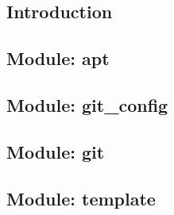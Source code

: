 
\subsection{Introduction}


\subsection{Module: apt}

\subsection{Module: git\_config}

\subsection{Module: git}

\subsection{Module: template}


